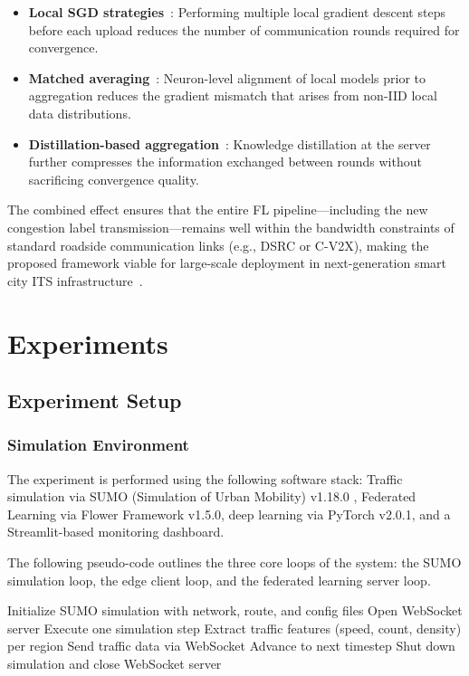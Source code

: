 \documentclass[pdflatex,sn-mathphys-num]{sn-jnl}
\theoremstyle{thmstyleone}
\theoremstyle{thmstyletwo}
\theoremstyle{thmstylethree}
\begin{document}
\begin{itemize}
    \item \textbf{Local SGD strategies}~\cite{lin2017deep}: Performing multiple
    local gradient descent steps before each upload reduces the number of
    communication rounds required for convergence.
    \item \textbf{Matched averaging}~\cite{wang2019adaptive}: Neuron-level
    alignment of local models prior to aggregation reduces the gradient
    mismatch that arises from non-IID local data distributions.
    \item \textbf{Distillation-based aggregation}~\cite{park2020privacy}:
    Knowledge distillation at the server further compresses the information
    exchanged between rounds without sacrificing convergence quality.
\end{itemize}

The combined effect ensures that the entire FL pipeline---including the new
congestion label transmission---remains well within the bandwidth constraints of
standard roadside communication links (e.g., DSRC or C-V2X), making the proposed
framework viable for large-scale deployment in next-generation smart city ITS
infrastructure~\cite{ye2020edgefed,chen2019deep}.


\section{Experiments}

\subsection{Experiment Setup}

\subsubsection{Simulation Environment}

The experiment is performed using the following software stack: Traffic simulation via SUMO (Simulation of Urban Mobility) v1.18.0 \cite{lopez2018sumo}, Federated Learning via Flower Framework v1.5.0, deep learning via PyTorch v2.0.1, and a Streamlit-based monitoring dashboard.

The following pseudo-code outlines the three core loops of the system: the SUMO simulation loop, the edge client loop, and the federated learning server loop.

\begin{algorithm}[H]
\caption{SUMO Simulation Loop}
\begin{algorithmic}[1]
\State Initialize SUMO simulation with network, route, and config files
\State Open WebSocket server
    \State Execute one simulation step
    \State Extract traffic features (speed, count, density) per region
        \State Send traffic data via WebSocket
    \EndFor
    \State Advance to next timestep
\EndWhile
\State Shut down simulation and close WebSocket server
\end{algorithmic}
\end{algorithm}
\end{document}
